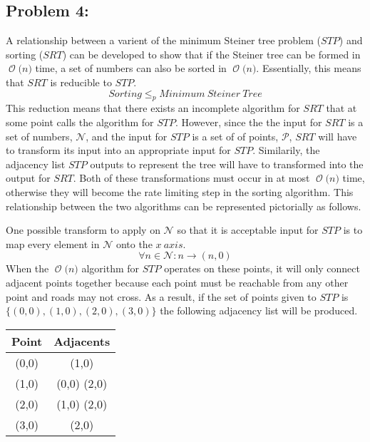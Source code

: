 \documentclass[12pt]{article}
\newcommand{\BigO}[1]{\ensuremath{\operatorname{\mathcal{O}}\bigl(#1\bigr)}}
\begin{document}
\subsection*{Problem 4:}
A relationship between a varient of the minimum Steiner tree problem ($STP$) and 
sorting ($SRT$) can be developed to show that if the Steiner tree can be formed
in \BigO{n} time, a set of numbers can also be sorted in \BigO{n}.  Essentially,
this means that $SRT$ is reducible to $STP$.
\[
Sorting \leq_{p} Minimum\ Steiner\ Tree
\]
This reduction means that there exists an incomplete algorithm for $SRT$ 
that at some point calls the algorithm for $STP$.  However, since the 
the input for $SRT$ is a set of numbers, $\mathcal{N}$, and the input for 
$STP$ is a set of of points, $\mathcal{P}$, $SRT$ will have to transform its
input into an appropriate input for $STP$.  Similarily, the adjacency list
$STP$ outputs to represent the tree will have to transformed into the output
for $SRT$.  Both of these transformations must occur in at most \BigO{n} time,
otherwise they will become the rate limiting step in the sorting algorithm. This
relationship between the two algorithms can be represented pictorially as follows. 
\begin{center}
\end{center}
One possible transform to apply on $\mathcal{N}$ so that it is acceptable input 
for $STP$ is to map every element in $\mathcal{N}$ onto the $x\ axis$.
\[
    \forall n\in\mathcal{N}:n\rightarrow(n,0)
\]
When the \BigO{n} algorithm for $STP$ operates on these points, it will only connect
adjacent points together because each point must be reachable from any other point
and roads may not cross.  As a result, if the set of points given to $STP$ is
$\{(0,0),(1,0),(2,0),(3,0)\}$ the following adjacency list will be produced.
\begin{center}
\begin{tabular}{c|c}
Point & Adjacents\\ \hline
(0,0) & (1,0)\\
(1,0) & (0,0) (2,0)\\
(2,0) & (1,0) (2,0)\\ 
(3,0) & (2,0)\\
\end{tabular} 
\end{center}
\end{document}
